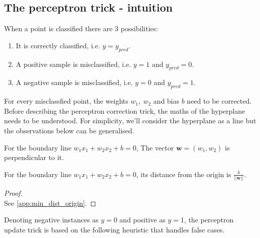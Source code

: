 \documentclass[a4paper]{article}
\begin{document}
\subsection{The perceptron trick - intuition}
When a point is classified there are 3 possibilities:
\begin{enumerate}
    \item It is correctly classified, i.e. $y = y_{pred}$.
    \item A positive sample is misclassified, i.e. $y=1$ and $y_{pred}=0$.
    \item A negative sample is misclassified, i.e. $y=0$ and $y_{pred}=1$.
\end{enumerate}
For every misclassfied point, the weights $w_1,\ w_2$ and bias $b$ need to be corrected. Before describing the perceptron correction trick, the maths of the hyperplane needs to be understood. For simplicity, we'll consider the hyperplane as a line but the observations below can be generalised.
\begin{corollary}
For the boundary line $w_1x_1 + w_2x_2 + b = 0$, The vector $\textbf{w} = (w_1,w_2)$ is perpendicular to it.
\end{corollary}
\begin{corollary} \label{cor:dist_from_origin}
For the boundary line $w_1x_1 + w_2x_2 + b = 0$, its distance from the origin is $\frac{b}{\left|\left|\textbf{w}\right|\right|}$.
\end{corollary}
\begin{proof}
\quad \\
See \ref{app:min_dist_origin}.
\end{proof}
Denoting negative instances as $y=0$ and positive as $y=1$, the perceptron update trick is based on the following heuristic that handles false cases.
\end{document}
